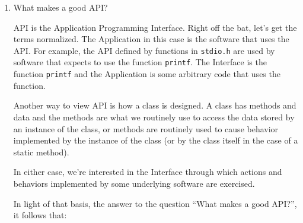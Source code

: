 \documentclass[12pt]{article}
\begin{document}
\begin{enumerate}

\item What makes a good API?
\par
API is the Application Programming Interface.  Right off the bat, let's
get the terms normalized.  The Application in this case is the software
that uses the API.   For example, the API defined by functions in
{\texttt{stdio.h}} are used by software that expects to use the function
{\texttt{printf}}.   The Interface is the function {\texttt{printf}}
and the Application is some arbitrary code that uses the function.
\par

Another way to view API is how a class is designed.  A class has
methods and data and the methods are what we routinely use to access the data
stored by an instance of the class, or methods are routinely used to
cause behavior implemented by the instance of the class (or by the class
itself in the case of a static method).

\par

In either case, we're interested in the Interface through which actions
and behaviors implemented by some underlying software are exercised.
\par

In light of that basis, the answer to the question ``What makes
a good API?'', it follows that:


\end{enumerate}
\end{document}
